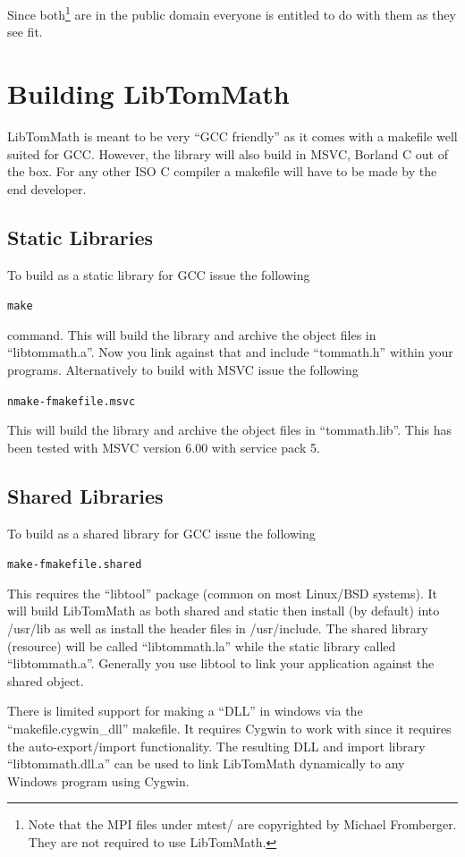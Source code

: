 \documentclass[synpaper]{book}
\begin{document}
Since both\footnote{Note that the MPI files under mtest/ are copyrighted by Michael Fromberger.  They are not required to use LibTomMath.} are in the 
public domain everyone is entitled to do with them as they see fit.

\section{Building LibTomMath}

LibTomMath is meant to be very ``GCC friendly'' as it comes with a makefile well suited for GCC.  However, the library will
also build in MSVC, Borland C out of the box.  For any other ISO C compiler a makefile will have to be made by the end
developer.  

\subsection{Static Libraries}
To build as a static library for GCC issue the following
\begin{alltt}
make
\end{alltt}

command.  This will build the library and archive the object files in ``libtommath.a''.  Now you link against 
that and include ``tommath.h'' within your programs.  Alternatively to build with MSVC issue the following
\begin{alltt}
nmake -f makefile.msvc
\end{alltt}

This will build the library and archive the object files in ``tommath.lib''.  This has been tested with MSVC 
version 6.00 with service pack 5.  

\subsection{Shared Libraries}
To build as a shared library for GCC issue the following
\begin{alltt}
make -f makefile.shared
\end{alltt}
This requires the ``libtool'' package (common on most Linux/BSD systems).  It will build LibTomMath as both shared
and static then install (by default) into /usr/lib as well as install the header files in /usr/include.  The shared 
library (resource) will be called ``libtommath.la'' while the static library called ``libtommath.a''.  Generally 
you use libtool to link your application against the shared object.  

There is limited support for making a ``DLL'' in windows via the ``makefile.cygwin\_dll'' makefile.  It requires 
Cygwin to work with since it requires the auto-export/import functionality.  The resulting DLL and import library 
``libtommath.dll.a'' can be used to link LibTomMath dynamically to any Windows program using Cygwin.
\end{document}

